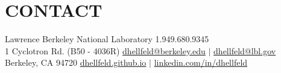 \vspace{-15pt}
\section{\small{CONTACT}}  

Lawrence Berkeley National Laboratory \hfill 1.949.680.9345\\
1 Cyclotron Rd. (B50 - 4036R) \hfill \href{mailto:dhellfeld@berkeley.edu}{dhellfeld@berkeley.edu} $|$ \href{mailto:dhellfeld@lbl.gov} {dhellfeld@lbl.gov} \\
Berkeley, CA  94720  \hfill \href{https://dhellfeld.github.io}{dhellfeld.github.io} $|$ \href{https://www.linkedin.com/in/dhellfeld}{linkedin.com{\small{/}}in{\small{/}}dhellfeld} 

